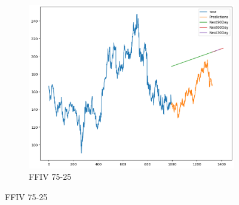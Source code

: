 \documentclass{ieeeojies}
\begin{document}
\begin{figure}[h]
    \hfill
    \begin{subfigure}[h]{0.33\linewidth}
        \centering
        \includegraphics[width=\linewidth]{Linear Plot/FFIV_Linear Regression_75_25.png}
        \caption{FFIV 75-25}
        \label{fig:ffiv-75-25}
    \end{subfigure}
\end{figure}
\vspace{-10pt}
\end{document}
